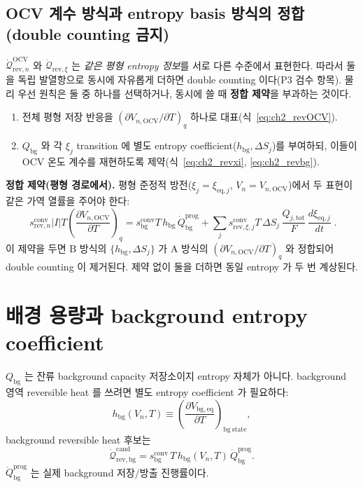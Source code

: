 \documentclass[11pt,a4paper]{article}
\newcommand{\eq}{\mathrm{eq}}
\newcommand{\tot}{\mathrm{tot}}
\newcommand{\bg}{\mathrm{bg}}
\newcommand{\OCV}{\mathrm{OCV}}
\newcommand{\rev}{\mathrm{rev}}
\newcommand{\prog}{\mathrm{prog}}
\newcommand{\cand}{\mathrm{cand}}
\newcommand{\conv}{\mathrm{conv}}
\begin{document}
\subsection{OCV 계수 방식과 entropy basis 방식의 정합 (double counting 금지)}\label{sec:ch2_double}
$\dot{\mathcal Q}_{\rev,n}^{\OCV}$ 와 $\dot{\mathcal Q}_{\rev,\xi}$ 는 \emph{같은 평형 entropy 정보}를 서로 다른
수준에서 표현한다. 따라서 둘을 독립 발열항으로 동시에 자유롭게 더하면 double counting 이다(P3 검수 항목).
물리 우선 원칙은 둘 중 하나를 선택하거나, 동시에 쓸 때 \textbf{정합 제약}을 부과하는 것이다.
\begin{enumerate}[label=\Alph*),leftmargin=2.0em]
\item 전체 평형 저장 반응을 $(\partial V_{n,\OCV}/\partial T)_q$ 하나로 대표(식~\eqref{eq:ch2_revOCV}).
\item $Q_\bg$ 와 각 $\xi_j$ transition 에 별도 entropy coefficient($h_\bg,\Delta S_j$)를 부여하되, 이들이
  OCV 온도 계수를 재현하도록 제약(식~\eqref{eq:ch2_revxi}, \eqref{eq:ch2_revbg}).
\end{enumerate}
\textbf{정합 제약(평형 경로에서).} 평형 준정적 방전($\xi_j=\xi_{\eq,j}$, $V_n=V_{n,\OCV}$)에서 두 표현이 같은
가역 열률을 주어야 한다:
\begin{equation}
\boxed{\;s_{\rev,n}^{\conv}|I|T\left(\frac{\partial V_{n,\OCV}}{\partial T}\right)_q
=s_\bg^{\conv}T\,h_\bg\,\dot Q_\bg^{\prog}
+\sum_{j}s_{\rev,\xi,j}^{\conv}T\,\Delta S_j\,\frac{Q_{j,\tot}}{F}\,\frac{d\xi_{\eq,j}}{dt}\;.}
\label{eq:ch2_consistency}
\end{equation}
이 제약을 두면 B 방식의 $\{h_\bg,\Delta S_j\}$ 가 A 방식의 $(\partial V_{n,\OCV}/\partial T)_q$ 와 정합되어
double counting 이 제거된다. 제약 없이 둘을 더하면 동일 entropy 가 두 번 계상된다.

\section{배경 용량과 background entropy coefficient}\label{sec:ch2_bg}
$Q_\bg$ 는 잔류 background capacity 저장소이지 entropy 자체가 아니다. background 영역 reversible heat 를
쓰려면 별도 entropy coefficient 가 필요하다:
\begin{equation}
h_\bg(V_n,T)\equiv\left(\frac{\partial V_{\bg,\eq}}{\partial T}\right)_{\mathrm{bg\ state}},
\label{eq:ch2_hbg}
\end{equation}
background reversible heat 후보는
\begin{equation}
\dot{\mathcal Q}_{\rev,\bg}^{\cand}=s_\bg^{\conv}\,T\,h_\bg(V_n,T)\,\dot Q_\bg^{\prog}.
\label{eq:ch2_revbg}
\end{equation}
$\dot Q_\bg^{\prog}$ 는 실제 background 저장/방출 진행률이다.
\end{document}
